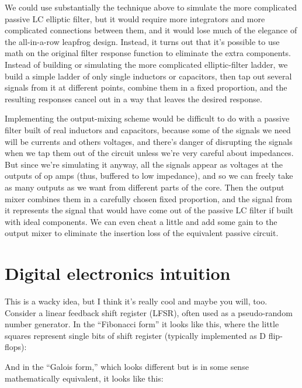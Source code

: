 We could use substantially the technique above to simulate the more
complicated passive LC elliptic filter, but it would require more
integrators and more complicated connections between them, and it would lose
much of the elegance of the all-in-a-row leapfrog design.  Instead, it turns
out that it's possible to use math on the original filter response function
to eliminate the extra components.  Instead of building or simulating the
more complicated elliptic-filter ladder, we build a simple ladder of only
single inductors or capacitors, then tap out several signals from it at
different points, combine them in a fixed proportion, and the resulting
responses cancel out in a way that leaves the desired response.

Implementing the output-mixing scheme would be difficult to do with a
passive filter built of real inductors and capacitors, because some of the
signals we need will be currents and others voltages, and there's danger of
disrupting the signals when we tap them out of the circuit unless we're very
careful about impedances.  But since we're simulating it anyway, all the
signals appear as voltages at the outputs of op amps (thus, buffered to low
impedance), and so we can freely take as many outputs as we want from
different parts of the core.  Then the output mixer combines them in a
carefully chosen fixed proportion, and the signal from it represents the
signal that would have come out of the passive LC filter if built with ideal
components.  We can even cheat a little and add some gain to the output
mixer to eliminate the insertion loss of the equivalent passive circuit.


\section{Digital electronics intuition}

This is a wacky idea, but I think it's really cool and maybe you will, too. 
Consider a linear feedback shift register (LFSR), often used as a
pseudo-random number generator.  In the ``Fibonacci form'' it looks like
this, where the little squares represent single bits of shift register
(typically implemented as D flip-flops):

{\centering\par}

And in the ``Galois form,'' which looks different but is in some sense
mathematically equivalent, it looks like this:

